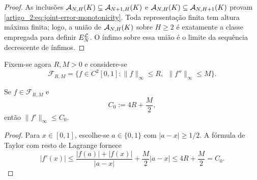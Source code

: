 \begin{proof}
As inclusões
$\mathcal{A}_{N,H}(K)\subseteq\mathcal{A}_{N+1,H}(K)$ e
$\mathcal{A}_{N,H}(K)\subseteq\mathcal{A}_{N,H+1}(K)$ provam
\eqref{artigo_2:eq:joint-error-monotonicity}. Toda representação finita tem altura
máxima finita; logo, a união de $\mathcal{A}_{N,H}(K)$ sobre $H\ge2$ é exatamente
a classe empregada para definir $E_N^{\mathcal{L}}$. O ínfimo sobre essa união é o
limite da sequência decrescente de ínfimos.
\end{proof}

Fixem-se agora $R,M>0$ e considere-se
\begin{equation}
 \mathcal{F}_{R,M}=\{f\in C^2[0,1]:\|f\|_\infty\le R,\
                                  \ \|f''\|_\infty\le M\}.
 \label{artigo_2:eq:function-class}
\end{equation}

\begin{lemma}\label{map:artigo_2:3.15}
\label{artigo_2:lem:derivative-control}
Se $f\in\mathcal F_{R,M}$ e
\begin{equation}
 C_0:=4R+\frac M2,
 \label{artigo_2:eq:derivative-constant}
\end{equation}
então $\|f'\|_\infty\le C_0$.
\end{lemma}

\begin{proof}
Para $x\in[0,1]$, escolhe-se $a\in\{0,1\}$ com $|a-x|\ge1/2$. A fórmula de Taylor com
resto de Lagrange fornece
\begin{equation}
 |f'(x)|
 \le\frac{|f(a)|+|f(x)|}{|a-x|}+\frac{M}{2}|a-x|
 \le4R+\frac M2=C_0.
 \label{artigo_2:eq:derivative-control}
\end{equation}
\end{proof}


